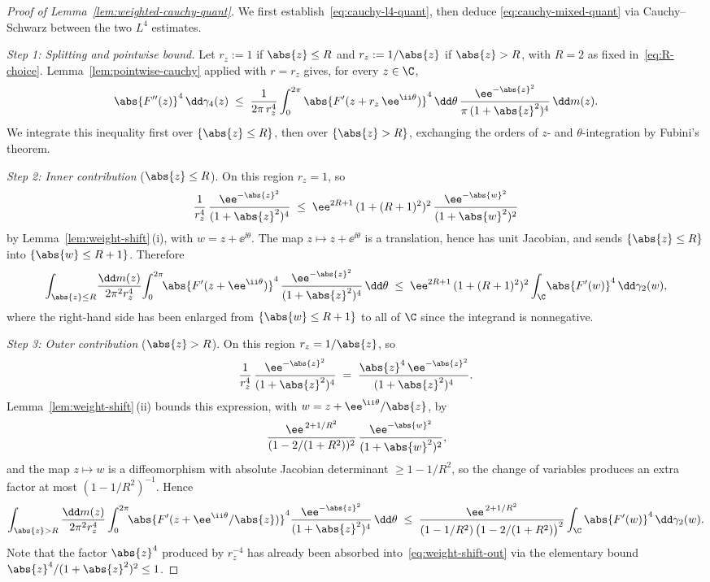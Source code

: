 \begin{proof}[Proof of Lemma~\ref{lem:weighted-cauchy-quant}]
We first establish~\eqref{eq:cauchy-l4-quant}, then deduce
\eqref{eq:cauchy-mixed-quant} via Cauchy--Schwarz between the two
$L^{4}$ estimates.

\medskip
\noindent\emph{Step 1: Splitting and pointwise bound.}\;
Let $r_{z} := 1$ if $\abs{z}\le R$ and $r_{z} := 1/\abs{z}$
if $\abs{z}>R$, with $R = 2$ as fixed
in~\eqref{eq:R-choice}. Lemma~\ref{lem:pointwise-cauchy} applied
with $r = r_{z}$ gives, for every $z \in \C$,
\[
\abs{F''(z)}^{4}\,\dd\gamma_{4}(z)
\;\le\;
\frac{1}{2\pi\, r_{z}^{4}}\int_{0}^{2\pi}
\abs{F'(z + r_{z}\,\ee^{\ii\theta})}^{4}\, \dd\theta\,
\frac{\ee^{-\abs{z}^{2}}}{\pi\,(1+\abs{z}^{2})^{4}}\,\dd m(z).
\]
We integrate this inequality first over $\{\abs{z}\le R\}$, then over
$\{\abs{z}>R\}$, exchanging the orders of $z$- and
$\theta$-integration by Fubini's theorem.

\medskip
\noindent\emph{Step 2: Inner contribution} ($\abs{z}\le R$).
On this region $r_{z} = 1$, so
\[
\frac{1}{r_{z}^{4}}\,\frac{\ee^{-\abs{z}^{2}}}{(1+\abs{z}^{2})^{4}}
\;\le\;
\ee^{2R+1}\,(1+(R+1)^{2})^{2}\,\frac{\ee^{-\abs{w}^{2}}}{(1+\abs{w}^{2})^{2}}
\]
by Lemma~\ref{lem:weight-shift}\,(i), with $w = z + \ee^{\ii\theta}$.
The map $z \mapsto z + \ee^{\ii\theta}$ is a translation, hence has unit
Jacobian, and sends $\{\abs{z}\le R\}$ into $\{\abs{w}\le R+1\}$.
Therefore
\[
\int_{\abs{z}\le R}\!\frac{\dd m(z)}{2\pi^{2} r_{z}^{4}}\!
\int_{0}^{2\pi}\!\!\abs{F'(z + \ee^{\ii\theta})}^{4}\,
\frac{\ee^{-\abs{z}^{2}}}{(1+\abs{z}^{2})^{4}}\,\dd\theta
\;\le\;
\ee^{2R+1}\,(1+(R+1)^{2})^{2}
\int_{\C}\!\abs{F'(w)}^{4}\,\dd\gamma_{2}(w),
\]
where the right-hand side has been enlarged from $\{\abs{w}\le R+1\}$
to all of $\C$ since the integrand is nonnegative.

\medskip
\noindent\emph{Step 3: Outer contribution} ($\abs{z}>R$).
On this region $r_{z} = 1/\abs{z}$, so
\[
\frac{1}{r_{z}^{4}}\,\frac{\ee^{-\abs{z}^{2}}}{(1+\abs{z}^{2})^{4}}
\;=\;
\frac{\abs{z}^{4}\,\ee^{-\abs{z}^{2}}}{(1+\abs{z}^{2})^{4}}.
\]
Lemma~\ref{lem:weight-shift}\,(ii) bounds this expression, with
$w = z + \ee^{\ii\theta}/\abs{z}$, by
\[
\frac{\ee^{\,2 + 1/R^{2}}}{(1-2/(1+R^{2}))^{2}}\,
\frac{\ee^{-\abs{w}^{2}}}{(1+\abs{w}^{2})^{2}},
\]
and the map $z\mapsto w$ is a diffeomorphism with absolute Jacobian
determinant $\ge 1 - 1/R^{2}$, so the change of variables produces an
extra factor at most $(1-1/R^{2})^{-1}$. Hence
\[
\int_{\abs{z}>R}\frac{\dd m(z)}{2\pi^{2}r_{z}^{4}}
\int_{0}^{2\pi}\!\!\abs{F'(z+\ee^{\ii\theta}/\abs{z})}^{4}
\frac{\ee^{-\abs{z}^{2}}}{(1+\abs{z}^{2})^{4}}\,\dd\theta
\;\le\;
\frac{\ee^{\,2+1/R^{2}}}
{(1-1/R^{2})\,\bigl(1-2/(1+R^{2})\bigr)^{2}}
\int_{\C}\abs{F'(w)}^{4}\,\dd\gamma_{2}(w).
\]
Note that the factor $\abs{z}^{4}$ produced by $r_{z}^{-4}$ has already
been absorbed into~\eqref{eq:weight-shift-out} via the elementary
bound $\abs{z}^{4}/(1+\abs{z}^{2})^{2}\le 1$.


\end{proof}
